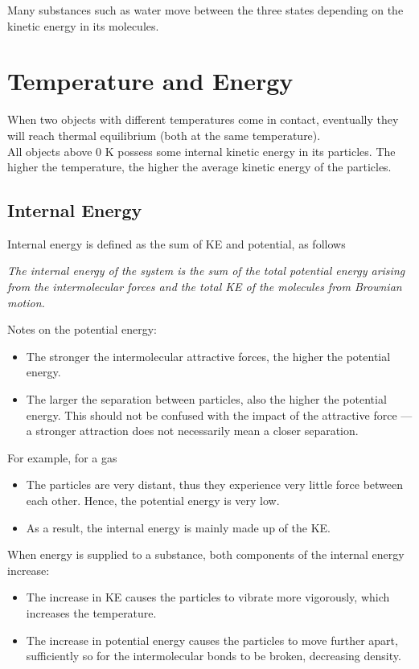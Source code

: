 \documentclass[a4paper,12pt]{article}
\let\oldsection\section
\renewcommand\section{\clearpage\oldsection}
\newcommand{\lb}{\\[8pt]}
\begin{document}
Many substances such as water move between the three states depending on the kinetic energy in its molecules.

\section{Temperature and Energy}

When two objects with different temperatures come in contact, eventually they will reach thermal equilibrium (both at the same temperature).\lb
All objects above 0 K possess some internal kinetic energy in its particles. The higher the temperature, the higher the average kinetic energy of the particles.

\subsection{Internal Energy}

Internal energy is defined as the sum of KE and potential, as follows
\begin{center}
  \textit{The internal energy of the system is the sum of the total potential energy arising from the intermolecular forces and the total KE of the molecules from Brownian motion.}
\end{center}
Notes on the potential energy:
\begin{itemize}
  \item The stronger the intermolecular attractive forces, the higher the potential energy.
  \item The larger the separation between particles, also the higher the potential energy. This should not be confused with the impact of the attractive force --- a stronger attraction does not necessarily mean a closer separation.
\end{itemize}

For example, for a gas
\begin{itemize}
  \item The particles are very distant, thus they experience very little force between each other. Hence, the potential energy is very low.
  \item As a result, the internal energy is mainly made up of the KE.
\end{itemize}
When energy is supplied to a substance, both components of the internal energy increase:
\begin{itemize}
  \item The increase in KE causes the particles to vibrate more vigorously, which increases the temperature.
  \item The increase in potential energy causes the particles to move further apart, sufficiently so for the intermolecular bonds to be broken, decreasing density.
\end{itemize}
\end{document}
